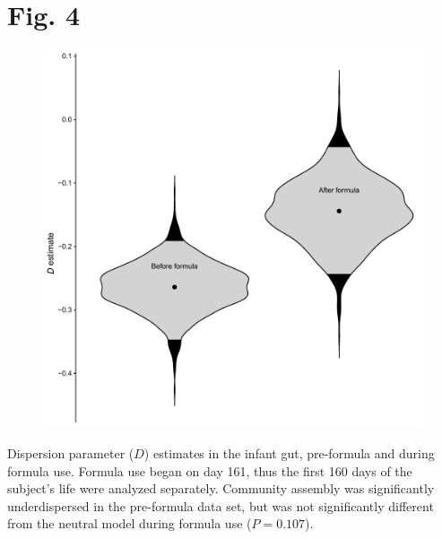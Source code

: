 \documentclass{article}
\begin{document}
\section*{Fig. 4}
\begin{figure}[ht]
	\centering
	\includegraphics[scale=0.80]{../Fig_4.pdf}
\end{figure}
Dispersion parameter (\(D\)) estimates in the infant gut, pre-formula and during formula use. Formula use began on day 161, thus the first 160 days of the subject's life were analyzed separately. Community assembly was significantly underdispersed in the pre-formula data set, but was not significantly different from the neutral model during formula use (\(P = 0.107\)).
%
\end{document}
